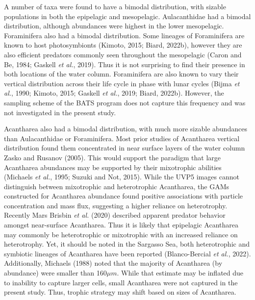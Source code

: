 \documentclass[
]{article}
\begin{document}
A number of taxa were found to have a bimodal distribution, with sizable
populations in both the epipelagic and mesopelagic. Aulacanthidae had a
bimodal distribution, although abundances were highest in the lower
mesopelagic. Foraminifera also had a bimodal distribution. Some lineages
of Foraminifera are known to host photosymbionts (Kimoto, 2015; Biard,
2022b), however they are also efficient predators commonly seen
throughout the mesopelagic (Caron and Be, 1984; Gaskell \emph{et al.},
2019). Thus it is not surprising to find their presence in both
locations of the water column. Foraminifera are also known to vary their
vertical distribution across their life cycle in phase with lunar cycles
(Bijma \emph{et al.}, 1990; Kimoto, 2015; Gaskell \emph{et al.}, 2019;
Biard, 2022b). However, the sampling scheme of the BATS program does not
capture this frequency and was not investigated in the present study.

Acantharea also had a bimodal distribution, with much more sizable
abundances than Aulacanthidae or Foraminifera. Most prior studies of
Acantharea vertical distribution found them concentrated in near surface
layers of the water column Zasko and Rusanov (2005). This would support
the paradigm that large Acantharea abundances may be supported by their
mixotrophic abilities (Michaels \emph{et al.}, 1995; Suzuki and Not,
2015). While the UVP5 images cannot distinguish between mixotrophic and
heterotrophic Acantharea, the GAMs constructed for Acantharea abundance
found positive associations with particle concentration and mass flux,
suggesting a higher reliance on heterotrophy. Recently Mars Brisbin
\emph{et al.} (2020) described apparent predator behavior amongst
near-surface Acantharea. Thus it is likely that epipelagic Acantharea
may commonly be heterotrophic or mixotrophic with an increased reliance
on heterotrophy. Yet, it should be noted in the Sargasso Sea, both
heterotrophic and symbiotic lineages of Acantharea have been reported
(Blanco-Bercial \emph{et al.}, 2022). Additionally, Michaels (1988)
noted that the majority of Acantharea (by abundance) were smaller than
160\(\mu m\). While that estimate may be inflated due to inability to
capture larger cells, small Acantharea were not captured in the present
study. Thus, trophic strategy may shift based on sizes of Acantharea.
\end{document}
